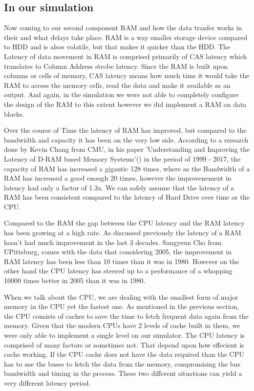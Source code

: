 \documentclass[12pt]{article}
\begin{document}
\subsection*{In our simulation}

Now coming to our second component RAM and how the data tranfer works in their and what delays take place.
RAM is a way smaller storage device compared to HDD and is alsos volatile, but that makes it quicker than
the HDD. The Latency of data movement in RAM is comprised primarily of CAS latency which translates to
Column Address strobe latency. Since the RAM is built upon columns or cells of memory,
CAS latency means how much time it would take the RAM to access the memory cells, read the data and make it
available as an output. And again, in the simulation we were not able to completely configure the design of
the RAM to this extent however we did implement a RAM on data blocks.

Over the course of Time the latency of RAM has improved, but compared to the bandwidth and capacity it has
been on the very low side. According to a research done by Kevin Chang from CMU, in his paper 'Understanding
and Improving the Latency of D-RAM based Memory Systems'(\cite {DRAMTimings}) in the period of 1999 - 2017,
the capacity of RAM has increased a gigantic 128 times, where as the Bandwidth of a RAM has increased a
good enough 20 times, however the improvenement in latency had  only a factor of 1.3x. We can safely assume
that the latency of a RAM has been consistent compared to the latency of Hard Drive over time or the CPU.

Compared to the RAM the gap between the CPU latency and the RAM latency has been growing at a high rate. As
discussed previously the latency of a RAM hasn't had much improvement in the last 3 decades. Sangyeun Cho
from UPittsburg, comes with the data that considering 2005, the improvement in RAM latency has been less than
10 times than it was in 1980. However on the other hand the CPU latency has steered up to a performance of
a whopping 10000 times better in 2005 than it was in 1980.

When we talk about the CPU, we are dealing with the smallest form of major memory in the CPU yet the fastest one.
As mentioned in the previous section, the CPU consists of caches to save the time to fetch frequent data
again from the memory. Given that the modern CPUs have 2 levels of cache built in them, we were only able to
implement a single level on our simulator. The CPU latency is comprised of many factors or sometimes not. That
depend upon how effecient is cache working. If the CPU cache does not have the data required than the CPU has
to use the buses to fetch the data from the memory, compromising the bus bandwidth and timing in the process.
These two different situations can yield a very different latency period.
\end{document}
